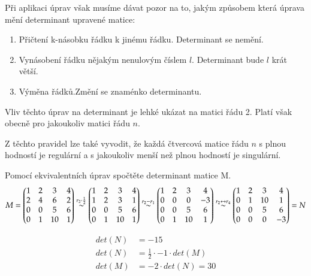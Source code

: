 Při aplikaci úprav však musíme dávat pozor na to, jakým způsobem která úprava mění
determinant upravené matice:

\begin{enumerate}
    \item Přičtení k-násobku řádku k jinému řádku. \hfill Determinant se nemění.
    \item Vynásobení řádku nějakým nenulovým číslem $l$. \hfill Determinant bude $l$ krát větší.
    \item Výměna řádků.\hfill Změní se znaménko determinantu.
\end{enumerate}

Vliv těchto úprav na determinant je lehké ukázat na matici řádu 2. Platí však obecně pro
jakoukoliv matici řádu $n$.

Z těchto pravidel lze také vyvodit, že každá čtvercová matice řádu $n$ s plnou hodností
je regulární a s jakoukoliv menší než plnou hodností je singulární.

\begin{example}
    Pomocí ekvivalentních úprav spočtěte determinant matice M.
    \[M=
    \begin{pmatrix}
        1 & 2 & 3 & 4 \\
        2 & 4 & 6 & 2 \\
        0 & 0 & 5 & 6 \\
        0 & 1 & 10 & 1
    \end{pmatrix}
    \overset{r_2 \cdot  \frac{1}{2}} \sim
    \begin{pmatrix}
        1 & 2 & 3 & 4 \\
        1 & 2 & 3 & 1 \\
        0 & 0 & 5 & 6 \\
        0 & 1 & 10 & 1
    \end{pmatrix} \overset{r_2 - r_1} \sim
    \begin{pmatrix}
        1 & 2 & 3 & 4 \\
        0 & 0 & 0 & -3 \\
        0 & 0 & 5 & 6 \\
        0 & 1 & 10 & 1
    \end{pmatrix} \overset{r_2 \leftrightarrow r_4} \sim
    \begin{pmatrix}
        1 & 2 & 3 & 4 \\
        0 & 1 & 10 & 1 \\
        0 & 0 & 5 & 6 \\
        0 & 0 & 0 & -3
    \end{pmatrix} = N
    \]

    \begin{align*}
        det(N) &= -15\\
        det(N) &= \frac{1}{2} \cdot -1 \cdot det(M)\\
        det(M) &= -2 \cdot det(N) = 30
    \end{align*}
\end{example}

